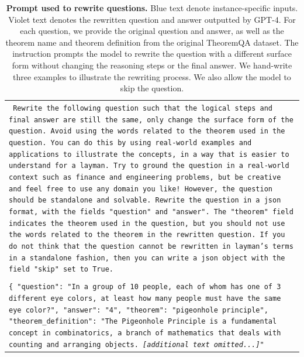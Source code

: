 \begin{table}[!th]
    \centering
    \small
    \caption{
        \textbf{Prompt used to rewrite \theorem questions.} {\color{blue} Blue text} denote instance-specific inputs. {\color{violet} Violet text} denotes the rewritten question and answer outputted by GPT-4.
        For each question, we provide the original question and answer, as well as the theorem name and theorem definition from the original TheoremQA dataset.
        The instruction prompts the model to rewrite the question with a different surface form without changing the reasoning steps or the final answer.
        We hand-write three examples to illustrate the rewriting process.
        We also allow the model to skip the question.
    }
    \label{tab:ex_rewrite}
    \begin{tabular}{>{\raggedright\arraybackslash\tt}p{}<{}}
        \toprule
            \vspace{-1em}
            Rewrite the following question such that the logical steps and final answer are still the same, only change the surface form of the question. Avoid using the words related to the theorem used in the question.
            You can do this by using real-world examples and applications to illustrate the concepts, in a way that is easier to understand for a layman.
            Try to ground the question in a real-world context such as finance and engineering problems, but be creative and feel free to use any domain you like! However, the question should be standalone and solvable.
            Rewrite the question in a json format, with the fields "question" and "answer".
            The "theorem" field indicates the theorem used in the question, but you should not use the words related to the theorem in the rewritten question.
            If you do not think that the question cannot be rewritten in layman's terms in a standalone fashion, then you can write a json object with the field "skip" set to True.
            \\\\
            \{
                "question": "In a group of 10 people, each of whom has one of 3 different eye colors, at least how many people must have the same eye color?",
                "answer": "4",
                "theorem": "pigeonhole principle",
                "theorem\_definition": "The Pigeonhole Principle is a fundamental concept in combinatorics, a branch of mathematics that deals with counting and arranging objects. \textit{[additional text omitted...]}"

\end{tabular}
\end{table}
